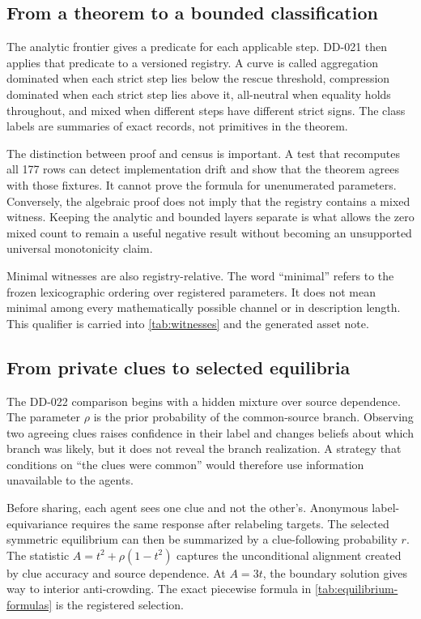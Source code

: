 \documentclass[12pt]{article}
\theoremstyle{definition}
\begin{document}
\subsection*{From a theorem to a bounded classification}

The analytic frontier gives a predicate for each applicable step. DD-021 then
applies that predicate to a versioned registry. A curve is called aggregation
dominated when each strict step lies below the rescue threshold, compression
dominated when each strict step lies above it, all-neutral when equality holds
throughout, and mixed when different steps have different strict signs. The
class labels are summaries of exact records, not primitives in the theorem.

The distinction between proof and census is important. A test that recomputes
all 177 rows can detect implementation drift and show that the theorem agrees
with those fixtures. It cannot prove the formula for unenumerated parameters.
Conversely, the algebraic proof does not imply that the registry contains a
mixed witness. Keeping the analytic and bounded layers separate is what allows
the zero mixed count to remain a useful negative result without becoming an
unsupported universal monotonicity claim.

Minimal witnesses are also registry-relative. The word ``minimal'' refers to
the frozen lexicographic ordering over registered parameters. It does not mean
minimal among every mathematically possible channel or in description length.
This qualifier is carried into \cref{tab:witnesses} and the generated asset note.

\subsection*{From private clues to selected equilibria}

The DD-022 comparison begins with a hidden mixture over source dependence. The
parameter $\rho$ is the prior probability of the common-source branch. Observing
two agreeing clues raises confidence in their label and changes beliefs about
which branch was likely, but it does not reveal the branch realization. A
strategy that conditions on ``the clues were common'' would therefore use
information unavailable to the agents.

Before sharing, each agent sees one clue and not the other's. Anonymous
label-equivariance requires the same response after relabeling targets. The
selected symmetric equilibrium can then be summarized by a clue-following
probability $r$. The statistic $A=t^2+\rho(1-t^2)$ captures the unconditional
alignment created by clue accuracy and source dependence. At $A=3t$, the
boundary solution gives way to interior anti-crowding. The exact piecewise
formula in \cref{tab:equilibrium-formulas} is the registered selection.
\end{document}
